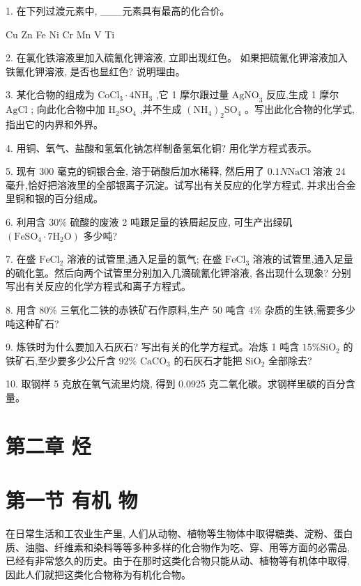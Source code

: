 \documentclass[10pt]{article}
\begin{document}
1. 在下列过渡元素中, \_\_\_元素具有最高的化合价。

Cu Zn Fe Ni Cr Mn V Ti

2. 在氯化铁溶液里加入硫氰化钾溶液, 立即出现红色。 如果把硫氰化钾溶液加入铁氰化钾溶液, 是否也显红色? 说明理由。

3. 某化合物的组成为 \({\mathrm{{CoCl}}}_{3} \cdot 4{\mathrm{{NH}}}_{3}\) ,它 1 摩尔跟过量 \({\mathrm{{AgNO}}}_{3}\) 反应,生成 1 摩尔 \(\mathrm{{AgCl}}\) ; 向此化合物中加 \({\mathrm{H}}_{2}{\mathrm{{SO}}}_{4}\) ,并不生成 \({\left( {\mathrm{{NH}}}_{4}\right) }_{2}{\mathrm{{SO}}}_{4}\) 。写出此化合物的化学式,指出它的内界和外界。

4. 用铜、氧气、盐酸和氢氧化钠怎样制备氢氧化铜? 用化学方程式表示。

5. 现有 300 毫克的铜银合金, 溶于硝酸后加水稀释, 然后用了 \({0.1N}\mathrm{{NaCl}}\) 溶液 24 毫升,恰好把溶液里的全部银离子沉淀。试写出有关反应的化学方程式, 并求出合金里铜和银的百分组成。

6. 利用含 \({30}\%\) 硫酸的废液 2 吨跟足量的铁屑起反应, 可生产出绿矶 \(\left( {{\mathrm{{FeSO}}}_{4} \cdot 7{\mathrm{H}}_{2}\mathrm{O}}\right)\) 多少吨?

7. 在盛 \({\mathrm{{FeCl}}}_{2}\) 溶液的试管里,通入足量的氯气; 在盛 \({\mathrm{{FeCl}}}_{3}\) 溶液的试管里,通入足量的硫化氢。然后向两个试管里分别加入几滴硫氰化钾溶液, 各出现什么现象? 分别写出有关反应的化学方程式和离子方程式。

8. 用含 \({80}\%\) 三氧化二铁的赤铁矿石作原料,生产 50 吨含 \(4\%\) 杂质的生铁,需要多少吨这种矿石?

9. 炼铁时为什么要加入石灰石? 写出有关的化学方程式。冶炼 1 吨含 \({15}\% {\mathrm{{SiO}}}_{2}\) 的铁矿石,至少要多少公斤含 \({92}\%\) \({\mathrm{{CaCO}}}_{3}\) 的石灰石才能把 \({\mathrm{{SiO}}}_{2}\) 全部除去?

10. 取钢样 5 克放在氧气流里灼烧, 得到 0.0925 克二氧化碳。求钢样里碳的百分含量。

\section*{第二章 烃}

\section*{第一节 有机 物}

在日常生活和工农业生产里, 人们从动物、植物等生物体中取得糖类、淀粉、蛋白质、油脂、纤维素和染料等等多种多样的化合物作为吃、穿、用等方面的必需品, 已经有非常悠久的历史。由于在那时这类化合物只能从动、植物等有机体中取得, 因此人们就把这类化合物称为有机化合物。
\end{document}

